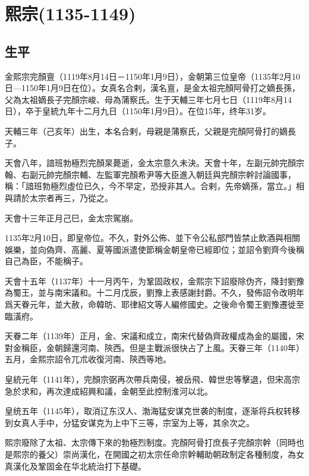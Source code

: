 
\section{熙宗\tiny(1135-1149)}

\subsection{生平}

金熙宗完顏亶（1119年8月14日－1150年1月9日），金朝第三位皇帝（1135年2月10日—1150年1月9日在位）。女真名合剌，漢名亶，是金太祖完顏阿骨打之嫡長孫，父為太祖嫡長子完顏宗峻、母為蒲察氏。生于天輔三年七月七日（1119年8月14日），卒于皇統九年十二月九日（1150年1月9日）。在位15年，终年31岁。

天輔三年（己亥年）出生，本名合剌，母親是蒲察氏，父親是完顏阿骨打的嫡長子。

天會八年，諳班勃極烈完顏杲薨逝，金太宗意久未決。天會十年，左副元帥完顏宗翰、右副元帥完顏宗輔、左監軍完顏希尹等大臣進入朝廷與完顏宗幹討論國事，稱：「諳班勃極烈虛位已久，今不早定，恐授非其人。合剌，先帝嫡孫，當立。」相與請於太宗者再三，乃從之。

天會十三年正月己巳，金太宗駕崩。

1135年2月10日，即皇帝位。不久，對外公佈、並下令公私部門皆禁止飲酒與相關娛樂，並向偽齊、高麗、夏等國派遣使節稱金朝皇帝已經即位；並詔令劉齊今後稱自己為臣，不能稱子。

天會十五年（1137年）十一月丙午，为鞏固政权，金熙宗下詔廢除伪齐，降封劉豫為蜀王，並与南宋議和。十二月戊辰，劉豫上表感謝封爵。不久，發佈詔令改明年爲天眷元年，並大赦，命韓昉、耶律紹文等人編修國史。之後命令蜀王劉豫遷徙至臨潢府。

天眷二年（1139年）正月，金、宋議和成立，南宋代替偽齊政權成為金的屬國，宋對金稱臣，金朝歸還河南、陝西。但是主戰派很快占了上風。天眷三年（1140年）五月，金熙宗詔令兀朮收復河南、陝西等地。

皇統元年（1141年），完顏宗弼再次帶兵南侵，被岳飛、韓世忠等擊退，但宋高宗急於求和，再次達成紹興和議，金朝至此控制淮河以北。

皇统五年（1145年），取消辽东汉人、渤海猛安谋克世袭的制度，逐渐将兵权转移到女真人手中，分猛安谋克为上中下三等，宗室为上等，其余次之。

熙宗廢除了太祖、太宗傳下來的勃極烈制度。完顏阿骨打庶長子完顏宗幹（同時也是熙宗的養父）崇尚漢化，在開國之初太宗任命宗幹輔助朝政制定各種制度，為女真漢化及鞏固金在华北統治打下基礎。

